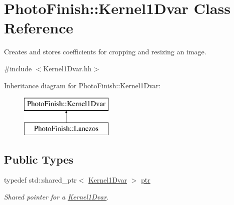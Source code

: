 \hypertarget{class_photo_finish_1_1_kernel1_dvar}{}\section{Photo\+Finish\+:\+:Kernel1\+Dvar Class Reference}
\label{class_photo_finish_1_1_kernel1_dvar}


Creates and stores coefficients for cropping and resizing an image.  




{\ttfamily \#include $<$Kernel1\+Dvar.\+hh$>$}

Inheritance diagram for Photo\+Finish\+:\+:Kernel1\+Dvar\+:\begin{figure}[H]
\begin{center}
\leavevmode
\includegraphics[height=2.000000cm]{class_photo_finish_1_1_kernel1_dvar}
\end{center}
\end{figure}
\subsection*{Public Types}
\begin{DoxyCompactItemize}
\item 
typedef std\+::shared\+\_\+ptr$<$ \hyperlink{class_photo_finish_1_1_kernel1_dvar}{Kernel1\+Dvar} $>$ \hyperlink{class_photo_finish_1_1_kernel1_dvar_a5e4ab77c4e5998cfb7341514a4f8fea8}{ptr}
\begin{DoxyCompactList}\small\item\em Shared pointer for a \hyperlink{class_photo_finish_1_1_kernel1_dvar}{Kernel1\+Dvar}. \end{DoxyCompactList}\end{DoxyCompactItemize}
